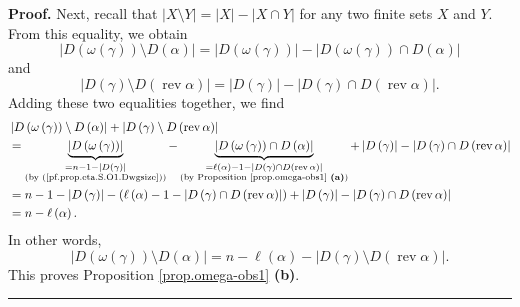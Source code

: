 \documentclass[numbers=enddot,12pt,final,onecolumn,notitlepage]{scrartcl}%
\theoremstyle{definition}
\newenvironment{proof}[1][Proof]{\noindent\textbf{#1.} }{\ \rule{0.5em}{0.5em}}
\begin{document}
\begin{proof}
Next, recall that $\left\vert X\setminus Y\right\vert =\left\vert X\right\vert
-\left\vert X\cap Y\right\vert $ for any two finite sets $X$ and $Y$. From
this equality, we obtain%
\begin{equation}
\left\vert D\left(  \omega\left(  \gamma\right)  \right)  \setminus D\left(
\alpha\right)  \right\vert =\left\vert D\left(  \omega\left(  \gamma\right)
\right)  \right\vert -\left\vert D\left(  \omega\left(  \gamma\right)
\right)  \cap D\left(  \alpha\right)  \right\vert \label{pf.prop.eta.S.O1.b1}%
\end{equation}
and%
\begin{equation}
\left\vert D\left(  \gamma\right)  \setminus D\left(  \operatorname*{rev}%
\alpha\right)  \right\vert =\left\vert D\left(  \gamma\right)  \right\vert
-\left\vert D\left(  \gamma\right)  \cap D\left(  \operatorname*{rev}%
\alpha\right)  \right\vert . \label{pf.prop.eta.S.O1.b2}%
\end{equation}
Adding these two equalities together, we find%
\begin{align*}
&  \left\vert D\left(  \omega\left(  \gamma\right)  \right)  \setminus
D\left(  \alpha\right)  \right\vert +\left\vert D\left(  \gamma\right)
\setminus D\left(  \operatorname*{rev}\alpha\right)  \right\vert \\
&  =\underbrace{\left\vert D\left(  \omega\left(  \gamma\right)  \right)
\right\vert }_{\substack{=n-1-\left\vert D\left(  \gamma\right)  \right\vert
\\\text{(by (\ref{pf.prop.eta.S.O1.Dwgsize}))}}}-\underbrace{\left\vert
D\left(  \omega\left(  \gamma\right)  \right)  \cap D\left(  \alpha\right)
\right\vert }_{\substack{=\ell\left(  \alpha\right)  -1-\left\vert D\left(
\gamma\right)  \cap D\left(  \operatorname*{rev}\alpha\right)  \right\vert
\\\text{(by Proposition \ref{prop.omega-obs1} \textbf{(a)})}}}+\left\vert
D\left(  \gamma\right)  \right\vert -\left\vert D\left(  \gamma\right)  \cap
D\left(  \operatorname*{rev}\alpha\right)  \right\vert \\
&  =n-1-\left\vert D\left(  \gamma\right)  \right\vert -\left(  \ell\left(
\alpha\right)  -1-\left\vert D\left(  \gamma\right)  \cap D\left(
\operatorname*{rev}\alpha\right)  \right\vert \right)  +\left\vert D\left(
\gamma\right)  \right\vert -\left\vert D\left(  \gamma\right)  \cap D\left(
\operatorname*{rev}\alpha\right)  \right\vert \\
&  =n-\ell\left(  \alpha\right)  .
\end{align*}
In other words,%
\[
\left\vert D\left(  \omega\left(  \gamma\right)  \right)  \setminus D\left(
\alpha\right)  \right\vert =n-\ell\left(  \alpha\right)  -\left\vert D\left(
\gamma\right)  \setminus D\left(  \operatorname*{rev}\alpha\right)
\right\vert .
\]
This proves Proposition \ref{prop.omega-obs1} \textbf{(b)}.
\end{proof}
\end{document}
